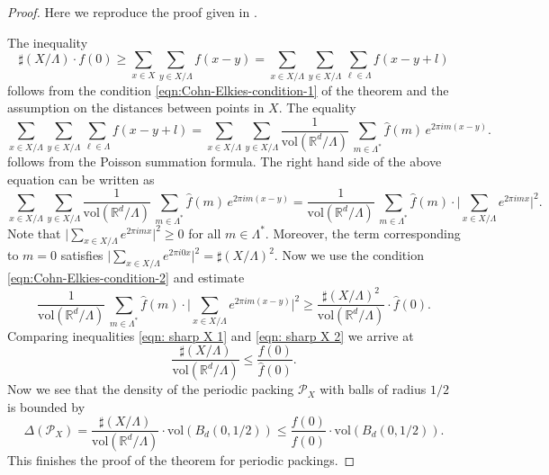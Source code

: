\begin{proof}\leanok
Here we reproduce the proof given in \cite{ElkiesCohn}.

The inequality
\begin{equation}\label{eqn: sharp X 1}
\sharp (X/\Lambda)\cdot f(0)\geq \sum_{x\in X}\sum_{y\in X/\Lambda}f(x-y)=\sum_{x\in X/\Lambda}\sum_{y\in X/\Lambda}\sum_{\ell\in  \Lambda}f(x-y+l)\end{equation}
follows from the condition \eqref{eqn:Cohn-Elkies-condition-1} of the theorem and the assumption on the distances between points in $X$.
The equality
$$\sum_{x\in X/\Lambda}\sum_{y\in X/\Lambda}\sum_{\ell\in  \Lambda}f(x-y+l)=\sum_{x\in X/\Lambda}\sum_{y\in X/\Lambda}\frac{1}{\mathrm{vol}(\mathbb{R}^d/\Lambda)}\,\sum_{m\in \Lambda^*} \widehat{f}(m)\,e^{2\pi i m(x-y)}.$$
follows from the Poisson summation formula.
The right hand side of the above equation can be written as
$$\sum_{x\in X/\Lambda}\sum_{y\in X/\Lambda}\frac{1}{\mathrm{vol}(\mathbb{R}^d/\Lambda)}\,\sum_{m\in \Lambda^*} \widehat{f}(m)\,e^{2\pi i m(x-y)}=\frac{1}{\mathrm{vol}(\mathbb{R}^d/\Lambda)}\,\sum_{m\in \Lambda^*} \widehat{f}(m)\cdot\big|\sum_{x\in X/\Lambda}e^{2\pi i m x}\big|^2.$$
Note that $\big|\sum_{x\in X/\Lambda}e^{2\pi i m x}\big|^2\geq0$ for all $m\in\Lambda^*$. Moreover,  the term corresponding to $m=0$ satisfies $\big|\sum_{x\in X/\Lambda}e^{2\pi i 0 x}\big|^2=\sharp (X/\Lambda)^2$.
Now we use the condition \eqref{eqn:Cohn-Elkies-condition-2} and estimate
\begin{equation}\label{eqn: sharp X 2}\frac{1}{\mathrm{vol}(\mathbb{R}^d/\Lambda)}\,\sum_{m\in \Lambda^*} \widehat{f}(m)\cdot\big|\sum_{x\in X/\Lambda}e^{2\pi i m(x-y)}\big|^2
\geq \frac{\sharp (X/\Lambda)^2}{\mathrm{vol}(\mathbb{R}^d/\Lambda)}\cdot \widehat{f}(0).
\end{equation}
Comparing inequalities \eqref{eqn: sharp X 1} and \eqref{eqn: sharp X 2} we arrive at
$$\frac{\sharp (X/\Lambda)}{\mathrm{vol}(\mathbb{R}^d/\Lambda)}\leq \frac{f(0)}{\widehat{f}(0)}.$$
Now we see that the density of the periodic packing $\mathcal{P}_X$ with balls of radius $1/2$ is bounded by
$$\Delta(\mathcal{P}_X)=\frac{\sharp (X/\Lambda)}{\mathrm{vol}(\mathbb{R}^d/\Lambda)}\cdot{\mathrm{vol}(B_d(0,1/2))}\leq
\frac{f(0)}{\widehat{f}(0)}\cdot \mathrm{vol}(B_d(0,1/2)).$$
This finishes the proof of the theorem for periodic packings.
\end{proof}

